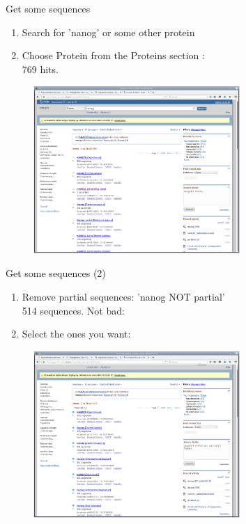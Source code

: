 \documentclass[pdf]{beamer}
\begin{document}
\begin{frame}{Get some sequences}
  \begin{enumerate}
  \item Search for 'nanog' or some other protein
  \item Choose Protein from the Proteins section :\\
    769 hits.
  \end{enumerate}
  \begin{figure}[ht]
    \includegraphics[width=0.7\textwidth]{images/ncbi_nanog_search_1.png}
  \end{figure}
\end{frame}

\begin{frame}{Get some sequences (2)}
  \begin{enumerate}
  \item Remove partial sequences: 'nanog NOT partial'\\
    514 sequences. Not bad:
  \item Select the ones you want:
  \end{enumerate}
  \begin{figure}[ht]
    \includegraphics[width=0.7\textwidth]{images/ncbi_nanog_search_2}
  \end{figure}
\end{frame}
\end{document}
